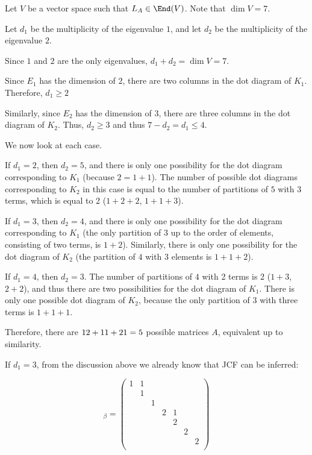 \documentclass[11pt]{scrartcl}
\begin{document}
\begin{soln}
  \hfill

  Let $V$ be a vector space such that $L_A \in \End(V)$. Note that
  $\dim V = 7$.

  Let $d_1$ be the multiplicity of the eigenvalue $1$, and let $d_{2}$
  be the multiplicity of the eigenvalue $2$.

  Since $1$ and $2$ are the only eigenvalues, $d_1+d_2 = \dim V=7$.

  Since $E_1$ has the dimension of $2$, there are two columns in the
  dot diagram of $K_1$. Therefore, $d_1 \geq 2$

  Similarly, since $E_2$ has the dimension of $3$, there are three
  columns in the dot diagram of $K_2$. Thus, $d_2\geq 3$ and thus
  $7-d_2 = d_1\leq 4$.

  We now look at each case.

  If $d_1 = 2$, then $d_2 = 5$, and there is only one possibility for
  the dot diagram corresponding to $K_1$ (because $2 = 1+1$). The
  number of possible dot diagrams corresponding to $K_2$ in this case
  is equal to the number of partitions of $5$ with 3 terms, which is
  equal to 2 ($1+2+2$, $1+1+3$).

  If $d_1 = 3$, then $d_2 = 4$, and there is only one possibility for
  the dot diagram corresponding to $K_1$ (the only partition of $3$ up
  to the order of elements, consisting of two terms, is
  $1+2$). Similarly, there is only one possibility for the dot diagram
  of $K_2$ (the partition of $4$ with 3 elements is $1+1+2$).

  If $d_1 = 4$, then $d_2 = 3$. The number of partitions of $4$ with 2
  terms is $2$ ($1+3$, $2+2$), and thus there are two possibilities
  for the dot diagram of $K_1$. There is only one possible dot diagram
  of $K_2$, because the only partition of $3$ with three terms is
  $1+1+1$.

  Therefore, there are $1 \* 2 + 1\* 1 + 2\* 1 = 5$ possible matrices
  $A$, equivalent up to similarity.

  If $d_1 = 3$, from the discussion above we already know that JCF can
  be inferred:

  \begin{equation*}
[A]_{\beta} = 
\begin{pmatrix}
  1 & 1 &   &  &  &  & \\
    & 1 &   &  &  &  & \\
    &   & 1 &  &  &  & \\
    &   &   & 2 & 1 &  & \\
    &   &   &   & 2 &  & \\
    &   &   &   &   & 2  & \\
    &   &   &   &   &   & 2 \\
  \end{pmatrix}
  \end{equation*}
\end{soln}
\end{document}

